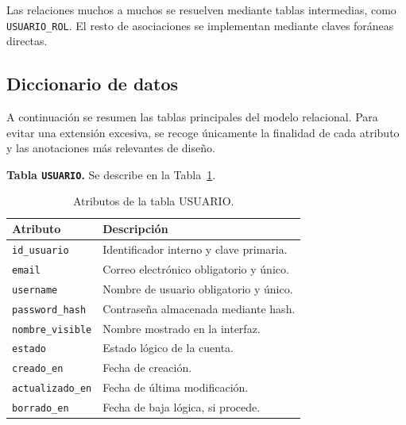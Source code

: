 Las relaciones muchos a muchos se resuelven mediante tablas intermedias, como \texttt{USUARIO\_ROL}. El resto de asociaciones se implementan mediante claves foráneas directas.

\subsection{Diccionario de datos}

A continuación se resumen las tablas principales del modelo relacional. Para evitar una extensión excesiva, se recoge únicamente la finalidad de cada atributo y las anotaciones más relevantes de diseño.

\newcommand{\tablaDiccionario}[3]{%
	\begin{table}[H]
		\centering
		\footnotesize
		\setlength{\tabcolsep}{3pt}
		\renewcommand{\arraystretch}{0.90}
		\begin{tabular}{@{}p{0.33\textwidth}p{0.57\textwidth}@{}}
			\toprule
			\textbf{Atributo} & \textbf{Descripción} \\
			\midrule
			#3
			\bottomrule
		\end{tabular}
		\caption{#1.}
		\label{tabla:#2}
	\end{table}
}
\noindent\textbf{Tabla \texttt{USUARIO}.} Se describe en la Tabla~\ref{tabla:usuario_atributos}.

\tablaDiccionario{Atributos de la tabla USUARIO}{usuario_atributos}{
	\texttt{id\_usuario} & Identificador interno y clave primaria.\\
	\texttt{email} & Correo electrónico obligatorio y único.\\
	\texttt{username} & Nombre de usuario obligatorio y único.\\
	\texttt{password\_hash} & Contraseña almacenada mediante hash.\\
	\texttt{nombre\_visible} & Nombre mostrado en la interfaz.\\
	\texttt{estado} & Estado lógico de la cuenta.\\
	\texttt{creado\_en} & Fecha de creación.\\
	\texttt{actualizado\_en} & Fecha de última modificación.\\
	\texttt{borrado\_en} & Fecha de baja lógica, si procede.\\
}


